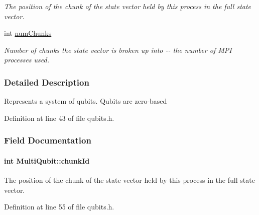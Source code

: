 \begin{DoxyCompactItemize}
\begin{DoxyCompactList}\small\item\em The position of the chunk of the state vector held by this process in the full state vector. \item\end{DoxyCompactList}\item 
int \hyperlink{structMultiQubit_acd43f2f57991709c9e94f73662c972b2}{numChunks}
\begin{DoxyCompactList}\small\item\em Number of chunks the state vector is broken up into -\/-\/ the number of MPI processes used. \item\end{DoxyCompactList}\end{DoxyCompactItemize}


\subsubsection{Detailed Description}
Represents a system of qubits. Qubits are zero-\/based 

Definition at line 43 of file qubits.h.

\subsubsection{Field Documentation}
\hypertarget{structMultiQubit_ab10c88249fa3825d6227ceec01d37e37}{
\paragraph[{chunkId}]{\setlength{\rightskip}{0pt plus 5cm}int {\bf MultiQubit::chunkId}}\hfill}
\label{structMultiQubit_ab10c88249fa3825d6227ceec01d37e37}


The position of the chunk of the state vector held by this process in the full state vector. 

Definition at line 55 of file qubits.h.

